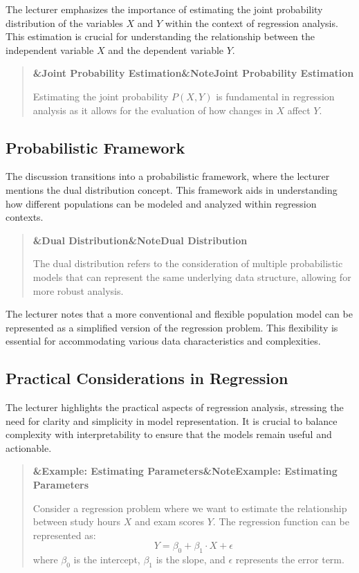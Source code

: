 \documentclass[a4paper]{article}
\newcommand{\boxheading}[1]{%
  \par\smallskip
  \noindent\textbf{\ifx&#1&Note\else#1\fi}\par
  \smallskip
}
\newenvironment{defbox}[1][]{%
  \begin{quote}\color{green!40!black}\boxheading{#1}\normalcolor
}{\end{quote}}
\newenvironment{exbox}[1][]{%
  \begin{quote}\color{brown!70!black}\boxheading{#1}\normalcolor
}{\end{quote}}
\newenvironment{rembox}[1][]{%
  \begin{quote}\color{black!70}\boxheading{#1}\normalcolor
}{\end{quote}}
\begin{document}
The lecturer emphasizes the importance of estimating the joint probability distribution of the variables \( X \) and \( Y \) within the context of regression analysis. This estimation is crucial for understanding the relationship between the independent variable \( X \) and the dependent variable \( Y \).

\begin{rembox}[Joint Probability Estimation]
Estimating the joint probability \( P(X, Y) \) is fundamental in regression analysis as it allows for the evaluation of how changes in \( X \) affect \( Y \).
\end{rembox}

\subsection{Probabilistic Framework}
The discussion transitions into a probabilistic framework, where the lecturer mentions the dual distribution concept. This framework aids in understanding how different populations can be modeled and analyzed within regression contexts.

\begin{defbox}[Dual Distribution]
The dual distribution refers to the consideration of multiple probabilistic models that can represent the same underlying data structure, allowing for more robust analysis.
\end{defbox}

The lecturer notes that a more conventional and flexible population model can be represented as a simplified version of the regression problem. This flexibility is essential for accommodating various data characteristics and complexities.

\subsection{Practical Considerations in Regression}
The lecturer highlights the practical aspects of regression analysis, stressing the need for clarity and simplicity in model representation. It is crucial to balance complexity with interpretability to ensure that the models remain useful and actionable.

\begin{exbox}[Example: Estimating Parameters]
Consider a regression problem where we want to estimate the relationship between study hours \( X \) and exam scores \( Y \). The regression function can be represented as:
\[
Y = \beta_0 + \beta_1 \cdot X + \epsilon
\]
where \( \beta_0 \) is the intercept, \( \beta_1 \) is the slope, and \( \epsilon \) represents the error term.
\end{exbox}
\end{document}
